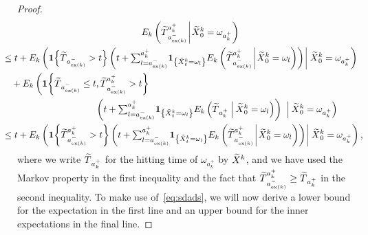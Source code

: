\documentclass[10pt]{amsart}
\theoremstyle{definition}\newtheorem{defi}[theo]{Definition}\newtheorem{rema}[theo]{Remark}\newtheorem{exam}[theo]{Example}\newtheorem{exem}[theo]{Example}\newtheorem{nota}[theo]{Notation}
\newcommand{\bfun}{\mathbf{1}}
\newcommand{\Ek}{{E_k}}
\newcommand\ex{\operatorname{ex}}
\newcommand{\aat}[1]{a_{\ex(#1)}^-}
\let\oldtilde\tilde
\renewcommand*{\tilde}[1]{\mathchoice{\widetilde{#1}}{\widetilde{#1}}{\oldtilde{#1}}{\oldtilde{#1}}}
\begin{document}
\begin{proof}
\begin{multline}\label{eq:sdads}
 \Ek\left(\tilde{T}_{\aat{k}}^{a_k^+}\:\vline\:\tilde{X}^k_0=\omega_{a_k^+}\right)\\
\mkern-30mu{
\begin{aligned}
&\leq t+\Ek\left(\bfun{\left\{\tilde{T}_{\aat{k}}>t\right\}}\left(t+ {\textstyle \sum_{l=\aat{k}}^{a_k^+}}\bfun_{\left\{\tilde{X}^k_t=\omega_l\right\}}\Ek\left(\tilde{T}_{\aat{k}}^{a_k^+}\:\vline\:\tilde{X}^k_0=\omega_l\right)\right)\:\vline\:\tilde{X}^k_0=\omega_{a_k^+}\right)\\
&\quad +\Ek\left(\bfun{\left\{\tilde{T}_{\aat{k}}\leq t,\tilde{T}_{\aat{k}}^{a_k^+}>t\right\}}\right.\\
&\mkern180mu\left.\left(t+ {\textstyle \sum_{l=\aat{k}}^{a_k^+}}\bfun_{\left\{\tilde{X}^k_t=\omega_l\right\}}\Ek\left(\tilde{T}_{a_k^+}\:\middle|\:\tilde{X}^k_0=\omega_l\right)\right)\right.\:\Big|\:\tilde{X}^k_0=\omega_{a_k^+}\Big)\\
&\leq t+\Ek\left(\bfun{\left\{\tilde{T}_{\aat{k}}^{a_k^+}>t\right\}}\left(t+ {\textstyle \sum_{l=\aat{k}}^{a_k^+}}\bfun_{\left\{\tilde{X}^k_t=\omega_l\right\}}\Ek\left(\tilde{T}_{\aat{k}}^{a_k^+}\:\vline\:\tilde{X}^k_0=\omega_l\right)\right)\:\vline\:\tilde{X}^k_0=\omega_{a_k^+}\right),
\end{aligned}}
\end{multline}
where we write $\tilde{T}_{{a_k^+}}$ for the hitting time of $\omega_{a_k^+}$ by $\tilde{X}^k$, and we have used the Markov property in the first inequality and the fact that $\tilde{T}_{\aat{k}}^{a_k^+}\geq \tilde{T}_{a_k^+}$ in the second inequality. To make use of~\eqref{eq:sdads}, we will now derive a lower bound for the expectation in the first line and an upper bound for the inner expectations in the final line.


\end{proof}
\end{document}
